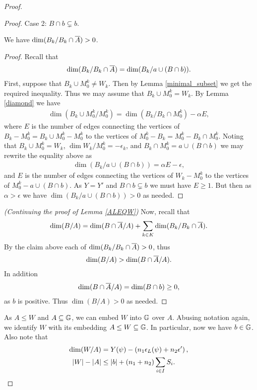 \begin{proof}
\begin{proof}
    Case 2: $B \cap b \subsetneq b$.
    \begin{Claim} We have $\dim(B_k / B_k \cap \overline{A}) > 0$.
    \end{Claim}
    \begin{proof}
      Recall that
      \begin{align*}
        \dim(B_k / B_k \cap \overline{A}) = \dim(B_k / a \cup (B \cap b)).
      \end{align*}
      First, suppose that $B_k \cup M_0^k \neq W_k$.
      Then by Lemma \ref{minimal_subset} we get the required inequality.
      Thus we may assume that $B_k \cup M_0^k = W_k$.
      By Lemma \ref{diamond} we have
      \begin{align*}
        \dim(B_k \cup M_0^k / M_0^k) = \dim(B_k / B_k \cap M_0^k) - \alpha E,
      \end{align*}
      where $E$ is the number of edges connecting the vertices of
      $B_k - M_0^k = B_k \cup M_0^k - M_0^k$ to the vertices of $M_0^k - B_k = M_0^k - B_k \cap M_0^k$.
      Noting that $B_k \cup M_0^k = W_k$, $\dim{W_k / M_0^k} = -\epsilon_k$, and $B_k \cap M_0^k = a \cup (B \cap b)$
      we may rewrite the equality above as
      \begin{align*}
        \dim(B_k / a \cup (B \cap b)) = \alpha E - \epsilon,
      \end{align*}
      and $E$ is the number of edges connecting the vertices of $W_k - M_0^k$ to the vertices of $M_0^k - a \cup (B \cap b)$.
      As $Y = Y'$ and $B \cap b \subsetneq b$ we must have $E \geq 1$.
      But then as $\alpha > \epsilon$ we have $\dim(B_k / a \cup (B \cap b)) > 0$ as needed.
    \end{proof}
    \textit{(Continuing the proof of Lemma \ref{ALEQW})}
    Now, recall that
    \begin{align*}
      \dim(B/A) = \dim(B \cap \overline{A} / A) + \sum_{k \in K} \dim(B_k/ B_k \cap \overline{A}).
    \end{align*}
    By the claim above each of $\dim(B_k/ B_k \cap \overline{A}) > 0$, thus
    \begin{align*}
      \dim(B/A) > \dim(B \cap \overline{A} / A).
    \end{align*}
    In addition
    \begin{align*}
      \dim(B \cap \overline{A} / A) = \dim (B \cap b) \geq 0,
    \end{align*}
    as $b$ is positive.
    Thus $\dim (B/A) > 0$ as needed.
  \end{proof}

  As $A \leq W$ and $A \subseteq \mathbb G$, we can embed $W$ into $\mathbb G$ over $A$.
  Abusing notation again, we identify $W$ with its embedding $A \leq W \subseteq \mathbb G$.
  In particular, now we have $b \in \mathbb G$.
  Also note that
  \begin{align*}
    \dim(W/A) &= Y(\psi) - \left(n_1 \epsilon_L(\psi) + n_2 \epsilon'\right), \\
    |W| - |A| &\leq |b| + (n_1 + n_2) \sum_{i \in I} S_i.
  \end{align*}


\end{proof}
